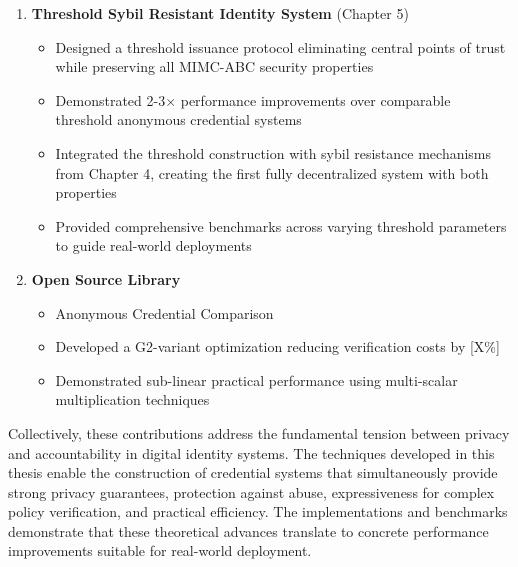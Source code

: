 \begin{enumerate}
    \item \textbf{Threshold Sybil Resistant Identity System} (Chapter 5)
        \begin{itemize}
            \item Designed a threshold issuance protocol eliminating central points of trust while preserving all MIMC-ABC security properties
            \item Demonstrated 2-3× performance improvements over comparable threshold anonymous credential systems
            \item Integrated the threshold construction with sybil resistance mechanisms from Chapter 4, creating the first fully decentralized system with both properties
            \item Provided comprehensive benchmarks across varying threshold parameters to guide real-world deployments
        \end{itemize}

        \item \textbf{Open Source Library}
        \begin{itemize}
            \item Anonymous Credential Comparison
            \item Developed a G2-variant optimization reducing verification costs by [X\%]
            \item Demonstrated sub-linear practical performance using multi-scalar multiplication techniques
        \end{itemize}
\end{enumerate}
Collectively, these contributions address the fundamental tension between privacy and accountability in digital identity systems. The techniques developed in this thesis enable the construction of credential systems that simultaneously provide strong privacy guarantees, protection against abuse, expressiveness for complex policy verification, and practical efficiency. The implementations and benchmarks demonstrate that these theoretical advances translate to concrete performance improvements suitable for real-world deployment.

